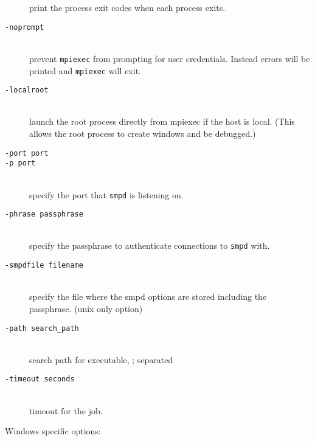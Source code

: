 \documentclass[dvipdfm,11pt]{article}
\begin{document}
\begin{description}
  print the process exit codes when each process exits.
\item[\texttt{-noprompt}]\mbox{}\\
  prevent \texttt{mpiexec} from prompting for user credentials.  Instead errors will
be printed and \texttt{mpiexec} will exit.
\item[\texttt{-localroot}]\mbox{}\\
  launch the root process directly from mpiexec if the host is local.
  (This allows the root process to create windows and be debugged.)
\item[\texttt{-port port}]
\item[\texttt{-p port}]\mbox{}\\
  specify the port that \texttt{smpd} is listening on.
\item[\texttt{-phrase passphrase}]\mbox{}\\
  specify the passphrase to authenticate connections to \texttt{smpd} with.
\item[\texttt{-smpdfile filename}]\mbox{}\\
  specify the file where the smpd options are stored including the 
passphrase. (unix only option)
\item[\texttt{-path search\_path}]\mbox{}\\
  search path for executable, ; separated
\item[\texttt{-timeout seconds}]\mbox{}\\
  timeout for the job. 
\end{description}
Windows specific options:
\end{document}
